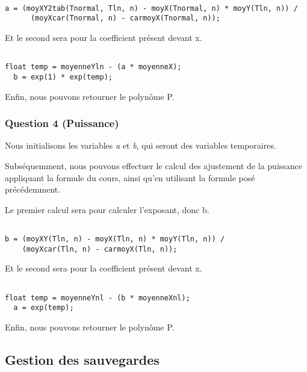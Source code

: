\documentclass[letter]{article}
\begin{document}
\begin{verbatim}

a = (moyXY2tab(Tnormal, Tln, n) - moyX(Tnormal, n) * moyY(Tln, n)) /
      (moyXcar(Tnormal, n) - carmoyX(Tnormal, n));

\end{verbatim}

Et le second sera pour la coefficient présent devant x.


\begin{verbatim}

float temp = moyenneYln - (a * moyenneX);
  b = exp(1) * exp(temp);

\end{verbatim}

Enfin, nous pouvons retourner le polynôme P.



\subsubsection{Question 4 (Puissance)}
\label{sec:org46ad138}

Nous initialisons les variables \emph{a} et \emph{b}, qui seront des variables temporaires.


Subséquemment, nous pouvons effectuer le calcul des ajustement de la puissance appliquant la formule du cours, ainsi qu'en utilisant la formule posé précédemment.

Le premier calcul sera pour calculer l'exposant, donc b.

\begin{verbatim}

b = (moyXY(Tln, n) - moyX(Tln, n) * moyY(Tln, n)) /
    (moyXcar(Tln, n) - carmoyX(Tln, n));

\end{verbatim}

Et le second sera pour la coefficient présent devant x.


\begin{verbatim}

float temp = moyenneYnl - (b * moyenneXnl);
  a = exp(temp);

\end{verbatim}

Enfin, nous pouvons retourner le polynôme P.


\subsection{Gestion des sauvegardes}
\label{sec:orgea98c50}
\end{document}
